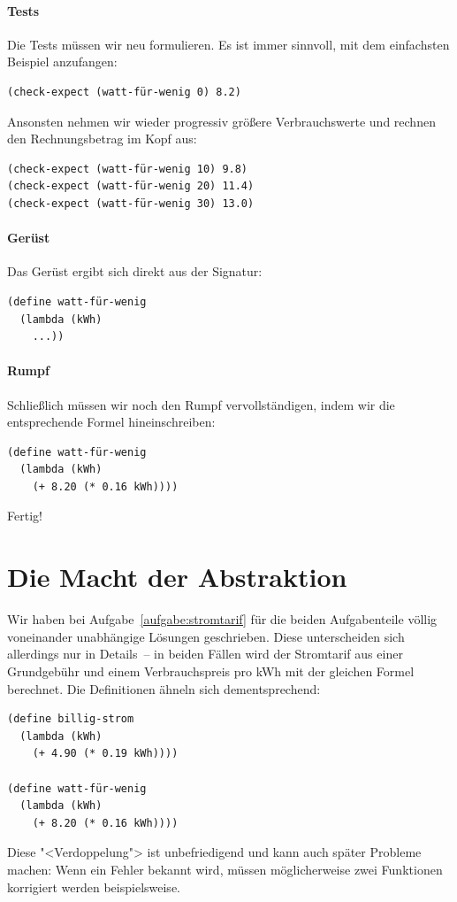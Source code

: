 \paragraph{Tests}

Die Tests müssen wir neu formulieren.  Es ist immer sinnvoll, mit dem
einfachsten Beispiel anzufangen:
\begin{verbatim}
(check-expect (watt-für-wenig 0) 8.2)
\end{verbatim}

Ansonsten nehmen wir wieder progressiv größere Verbrauchswerte und
rechnen den Rechnungsbetrag im Kopf aus:
%
\begin{verbatim}
(check-expect (watt-für-wenig 10) 9.8)
(check-expect (watt-für-wenig 20) 11.4)
(check-expect (watt-für-wenig 30) 13.0)
\end{verbatim}

\paragraph{Gerüst}

Das Gerüst ergibt sich direkt aus der Signatur:
%
\begin{verbatim}
(define watt-für-wenig
  (lambda (kWh)
    ...))
\end{verbatim}

\paragraph{Rumpf}

Schließlich müssen wir noch den Rumpf vervollständigen, indem wir die
entsprechende Formel hineinschreiben:
%
\begin{verbatim}
(define watt-für-wenig
  (lambda (kWh)
    (+ 8.20 (* 0.16 kWh))))
\end{verbatim}
%
Fertig!

\section{Die Macht der Abstraktion}

Wir haben bei Aufgabe~\ref{aufgabe:stromtarif} für die beiden
Aufgabenteile völlig voneinander unabhängige Lösungen geschrieben.
Diese unterscheiden sich allerdings nur in Details~-- in beiden Fällen
wird der Stromtarif aus einer Grundgebühr und einem Verbrauchspreis
pro kWh mit der gleichen Formel berechnet.  Die Definitionen ähneln
sich dementsprechend:
%
\begin{verbatim}
(define billig-strom
  (lambda (kWh)
    (+ 4.90 (* 0.19 kWh))))

(define watt-für-wenig
  (lambda (kWh)
    (+ 8.20 (* 0.16 kWh))))
\end{verbatim}
%
Diese "<Verdoppelung"> ist unbefriedigend und kann auch später
Probleme machen: Wenn ein Fehler bekannt wird, müssen möglicherweise
zwei Funktionen korrigiert werden beispielsweise.

